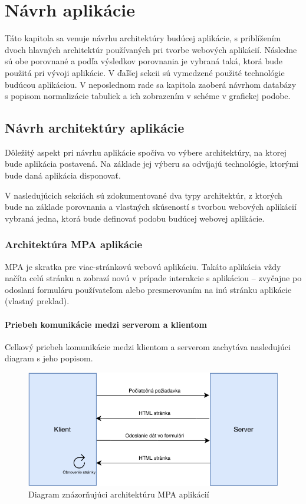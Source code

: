 \chapter{Návrh aplikácie}
Táto kapitola sa venuje návrhu architektúry budúcej aplikácie, s priblížením dvoch hlavných architektúr používaných pri tvorbe webových aplikácií. Následne sú obe porovnané a podľa výsledkov porovnania je vybraná taká, ktorá bude použitá pri vývoji aplikácie. V ďaľšej sekcii sú vymedzené použité technológie budúcou aplikáciou. V neposlednom rade sa kapitola zaoberá návrhom databázy s popisom normalizácie tabuliek a ich zobrazením v schéme v grafickej podobe.

\section{Návrh architektúry aplikácie}
Dôležitý aspekt pri návrhu aplikácie spočíva vo výbere architektúry, na ktorej bude aplikácia postavená. Na základe jej výberu sa odvíjajú technológie, ktorými bude daná aplikácia disponovať.

V nasledujúcich sekciách sú zdokumentované dva typy architektúr, z ktorých bude na základe porovnania a vlastných skúseností s tvorbou webových aplikácií vybraná jedna, ktorá bude definovať podobu budúcej webovej aplikácie.

\subsection{Architektúra MPA aplikácie}
MPA je skratka pre viac-stránkovú webovú aplikáciu. Takáto aplikácia vždy načíta celú stránku a zobrazí novú v prípade  interakcie s aplikáciou -- zvyčajne po odoslaní formuláru používateľom alebo presmerovaním na inú stránku aplikácie \cite{spa-vs-mpa-1} (vlastný preklad).

\subsubsection*{Priebeh komunikácie medzi serverom a klientom}
Celkový priebeh komunikácie medzi klientom a serverom zachytáva nasledujúci diagram s jeho popisom.

\begin{figure}[H]
	\includegraphics[width=1.0\textwidth]{media/navrh/MPA.pdf}
	\caption{Diagram znázorňujúci architektúru MPA aplikácií}\label{mpa-graf}
\end{figure}

